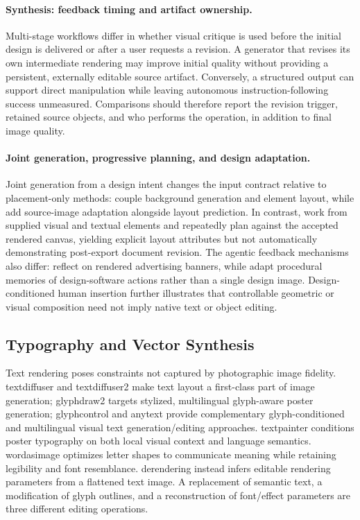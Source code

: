 \paragraph{Synthesis: feedback timing and artifact ownership.}
Multi-stage workflows differ in whether visual critique is used before the initial design is delivered or after a user requests a revision.
A generator that revises its own intermediate rendering may improve initial quality without providing a persistent, externally editable source artifact.
Conversely, a structured output can support direct manipulation while leaving autonomous instruction-following success unmeasured.
Comparisons should therefore report the revision trigger, retained source objects, and who performs the operation, in addition to final image quality.

\paragraph{Joint generation, progressive planning, and design adaptation.}
Joint generation from a design intent changes the input contract relative to placement-only methods: \citet{yang2026interil} couple background generation and element layout, while \citet{yang2026contenteditedlayout} add source-image adaptation alongside layout prediction.
In contrast, \citet{lee2026playground} work from supplied visual and textual elements and repeatedly plan against the accepted rendered canvas, yielding explicit layout attributes but not automatically demonstrating post-export document revision.
The agentic feedback mechanisms also differ: \citet{wang2025mimo} reflect on rendered advertising banners, while \citet{du2026designerrsi} adapt procedural memories of design-software actions rather than a single design image.
Design-conditioned human insertion \citep{hou2026humanaware} further illustrates that controllable geometric or visual composition need not imply native text or object editing.

\subsection{Typography and Vector Synthesis}
Text rendering poses constraints not captured by photographic image fidelity.
\ac{textdiffuser} and \ac{textdiffuser2} make text layout a first-class part of image generation; \ac{glyphdraw2} targets stylized, multilingual glyph-aware poster generation; \ac{glyphcontrol} and \ac{anytext} provide complementary glyph-conditioned and multilingual visual text generation/editing approaches.
\ac{textpainter} conditions poster typography on both local visual context and language semantics.
\ac{wordasimage} optimizes letter shapes to communicate meaning while retaining legibility and font resemblance.
\ac{derendering} instead infers editable rendering parameters from a flattened text image.
A replacement of semantic text, a modification of glyph outlines, and a reconstruction of font/effect parameters are three different editing operations.

